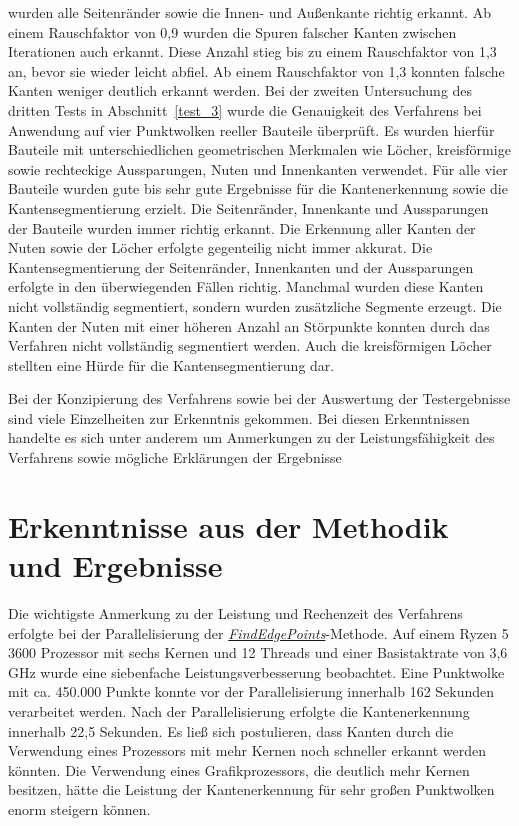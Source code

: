 wurden alle Seitenränder sowie die Innen- und Außenkante richtig erkannt. Ab einem Rauschfaktor von 0,9 wurden die Spuren falscher Kanten zwischen Iterationen auch erkannt. Diese Anzahl stieg bis zu einem Rauschfaktor von 1,3 an, bevor sie wieder leicht abfiel. Ab einem Rauschfaktor von 1,3 konnten falsche Kanten weniger deutlich erkannt werden. Bei der zweiten Untersuchung des dritten Tests in Abschnitt~\ref{test_3} wurde die Genauigkeit des Verfahrens bei Anwendung auf vier Punktwolken reeller Bauteile überprüft. Es wurden hierfür Bauteile mit unterschiedlichen geometrischen Merkmalen wie Löcher, kreisförmige sowie rechteckige Aussparungen, Nuten und Innenkanten verwendet. Für alle vier Bauteile wurden gute bis sehr gute Ergebnisse für die Kantenerkennung sowie die Kantensegmentierung erzielt. Die Seitenränder, Innenkante und Aussparungen der Bauteile wurden immer richtig erkannt. Die Erkennung aller Kanten der Nuten sowie der Löcher erfolgte gegenteilig nicht immer akkurat. Die Kantensegmentierung der Seitenränder, Innenkanten und der Aussparungen erfolgte in den überwiegenden Fällen richtig. Manchmal wurden diese Kanten nicht vollständig segmentiert, sondern wurden zusätzliche Segmente erzeugt. Die Kanten der Nuten mit einer höheren Anzahl an Störpunkte konnten durch das Verfahren nicht vollständig segmentiert werden. Auch die kreisförmigen Löcher stellten eine Hürde für die Kantensegmentierung dar. 

Bei der Konzipierung des Verfahrens sowie bei der Auswertung der Testergebnisse sind viele Einzelheiten zur Erkenntnis gekommen. Bei diesen Erkenntnissen handelte es sich unter anderem um Anmerkungen zu der Leistungsfähigkeit des Verfahrens sowie mögliche Erklärungen der Ergebnisse

\section{Erkenntnisse aus der Methodik und Ergebnisse} \label{Erkenntnisse}

Die wichtigste Anmerkung zu der Leistung und Rechenzeit des Verfahrens erfolgte bei der Parallelisierung der \textit{\hyperref[alg:find_edge_points]{FindEdgePoints}}-Methode. Auf einem Ryzen 5 3600 Prozessor \autocite{noauthor_amd_2022} mit sechs Kernen und 12 Threads und einer Basistaktrate von 3,6 GHz wurde eine siebenfache Leistungsverbesserung beobachtet. Eine Punktwolke mit ca. 450.000 Punkte konnte vor der Parallelisierung innerhalb 162 Sekunden verarbeitet werden. Nach der Parallelisierung erfolgte die Kantenerkennung innerhalb 22,5 Sekunden. Es ließ sich postulieren, dass Kanten durch die Verwendung eines Prozessors mit mehr Kernen noch schneller erkannt werden könnten. Die Verwendung eines Grafikprozessors, die deutlich mehr Kernen besitzen, hätte die Leistung der Kantenerkennung für sehr großen Punktwolken enorm steigern können.

